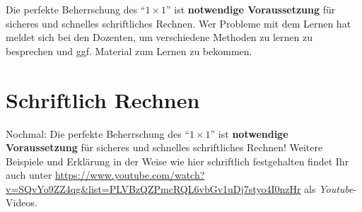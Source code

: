 \documentclass[a4paper]{book}%
\def\mcr{\pgfmatrixcurrentrow}\def\mcc{\pgfmatrixcurrentcolumn}
\theoremstyle{definition}
\begin{document}

Die perfekte Beherrschung des \enquote{$1 \times 1$} ist \textbf{notwendige Voraussetzung} für sicheres und schnelles schriftliches Rechnen. Wer Probleme mit dem Lernen hat meldet sich bei den Dozenten, um verschiedene Methoden zu lernen zu besprechen und ggf. Material zum Lernen zu bekommen.

\chapter{Schriftlich Rechnen}

Nochmal: Die perfekte Beherrschung des \enquote{$1 \times 1$} ist \textbf{notwendige Voraussetzung} für sicheres und schnelles schriftliches Rechnen! Weitere Beispiele und Erklärung in der Weise wie hier schriftlich festgehalten findet Ihr auch unter \url{https://www.youtube.com/watch?v=SQvYo9ZZ4qg&list=PLVBzQZPmcRQL6vbGv1uDj7styo4I0nzHr} als \textit{Youtube}-Videos.
\end{document}
